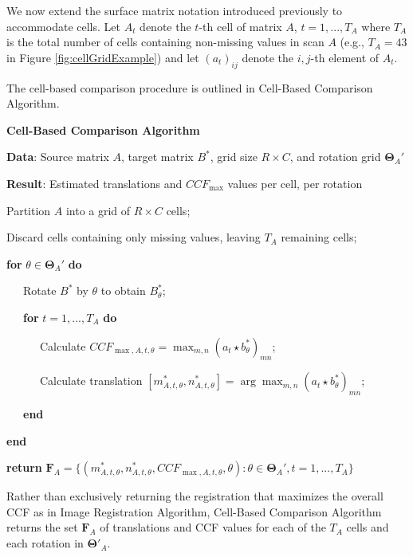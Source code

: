 \documentclass[11pt,]{isuthesis}
\begin{document}
We now extend the surface matrix notation introduced previously to accommodate cells.
Let \(A_{t}\) denote the \(t\)-th cell of matrix \(A\), \(t = 1,...,T_A\) where \(T_A\) is the total number of cells containing non-missing values in scan \(A\) (e.g., \(T_A = 43\) in Figure \ref{fig:cellGridExample}) and let \((a_t)_{ij}\) denote the \(i,j\)-th element of \(A_t\).

The cell-based comparison procedure is outlined in Cell-Based Comparison Algorithm.

\textbf{Cell-Based Comparison Algorithm}

\textbf{Data}: Source matrix \(A\), target matrix \(B^*\), grid size \(R \times C\), and rotation grid \(\pmb{\Theta}_{A}'\)

\textbf{Result}: Estimated translations and \(CCF_{\max}\) values per cell, per rotation

Partition \(A\) into a grid of \(R \times C\) cells;

Discard cells containing only missing values, leaving \(T_A\) remaining cells;

\textbf{for} \(\theta \in \pmb{\Theta}_{A}'\) \textbf{do}

~~~Rotate \(B^*\) by \(\theta\) to obtain \(B_{\theta}^*\);

~~~\textbf{for} \(t = 1,...,T_A\) \textbf{do}

~~~~~~Calculate \(CCF_{\max,A,t,\theta} = \max_{m,n} (a_t \star b_{\theta}^*)_{mn}\);

~~~~~~Calculate translation \([m_{A,t,\theta}^*, n_{A,t,\theta}^*] = \arg \max_{m,n} (a_t \star b_{\theta}^*)_{mn}\);

~~~\textbf{end}

\textbf{end}

\textbf{return} \(\pmb{F}_A = \{(m_{A,t,\theta}^*, n_{A,t,\theta}^*, CCF_{\max,A,t,\theta}, \theta) : \theta \in \pmb{\Theta}_{A}', t = 1,...,T_A\}\)

Rather than exclusively returning the registration that maximizes the overall CCF as in Image Registration Algorithm, Cell-Based Comparison Algorithm returns the set \(\pmb{F}_A\) of translations and CCF values for each of the \(T_A\) cells and each rotation in \(\pmb{\Theta}'_A\).
\end{document}
